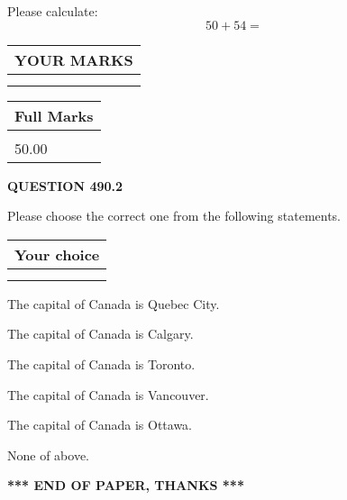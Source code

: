 \documentclass[12pt]{article}
\begin{document}
  
 
Please calculate:
\begin{equation}
50 +  %
54 = \nonumber
\end{equation}
 

 

 
  
\vspace{0.2in}
  
\noindent\begin{tabular}{|l|}
\hline
 YOUR MARKS  \\
\hline
 \\ 
 \\ 
\hline
\end{tabular}
\hspace{0.05in} \begin{tabular}{|l|}
\hline
 Full Marks  \\
\hline
 \\ 
50.00 \\
\hline
\end{tabular}
{\textbf{\Large{QUESTION
490.2 
}}}
  
  
Please choose the correct one from the following statements.
  
  
\noindent\hspace{3.0in} \begin{tabular}{|l|}
\hline
Your choice \\
\hline
 \\ 
 \\ 
\hline
\end{tabular}
  
  
 
 
The capital of Canada is Quebec City.
 
 
The capital of Canada is Calgary.
 
 
The capital of Canada is Toronto.
 
 
The capital of Canada is Vancouver.
 
 
The capital of Canada is Ottawa.
 
 
 None of above.
 
 
   
   
 \vspace{0.2in}
 
   
   
   
   
\vspace{1.0in} 
{\textbf{\large{ *** END OF PAPER, THANKS *** }}} 
   
\end{document}
